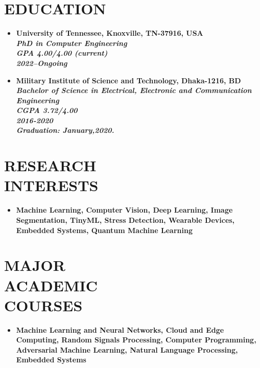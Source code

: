 \documentclass[margin]{res}
\begin{document}
\begin{resume}


\section{EDUCATION}
\begin{itemize}
\item \bf{University of Tennessee, Knoxville}, TN-37916, USA\\
\sl PhD in Computer Engineering\\
\sl GPA \bf 4.00/4.00 (current)\\
\textbf {2022--Ongoing}
\item \bf{Military Institute of Science and Technology}, Dhaka-1216, BD\\
\sl Bachelor of Science in Electrical, Electronic and Communication Engineering\\
\sl CGPA \bf 3.72/4.00\\
\textbf {2016-2020}\\
\sl Graduation: \bf January,2020.


\end{itemize}

\section{RESEARCH\\INTERESTS}
\begin{itemize}
\item \bf Machine Learning, \bf Computer Vision, \bf Deep Learning, \bf Image Segmentation, \bf TinyML, \bf Stress Detection, \bf Wearable Devices, \bf Embedded Systems, \bf Quantum Machine Learning
\end{itemize}

\section{MAJOR\\ACADEMIC\\COURSES}
\begin{itemize}
\item \bf Machine Learning and Neural Networks,
\bf Cloud and Edge Computing,
\bf Random Signals Processing,
\bf Computer Programming,
\bf Adversarial Machine Learning,
\bf Natural Language Processing,
\bf Embedded Systems
\end{itemize}



\end{resume}
\end{document}
